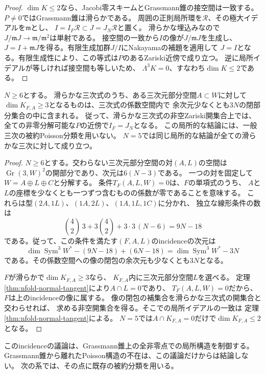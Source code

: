 \begin{proof}
$\dim K\le2$なら、Jacobi零スキームとGrassmann錐の接空間は一致する。
$P\ne0$ではGrassmann錐は滑らかである。
周囲の正則局所環を$\mathcal R$、その極大イデアルを$\mathfrak m$とし、
$I=I_F\mathcal R\subset J=J_N\mathcal R$と置く。
滑らかな埋込みなので$J/\mathfrak mJ\to\mathfrak m/\mathfrak m^2$は単射である。
接空間の一致から$I$の像が$J/\mathfrak mJ$を生成し、
$J=I+\mathfrak mJ$を得る。有限生成加群$J/I$にNakayamaの補題を適用して
$J=I$となる。有限生成性により、この等式は$P$のあるZariski近傍で成り立つ。
逆に局所イデアルが等しければ接空間も等しいため、
$\Lambda^3K=0$、すなわち$\dim K\le2$である。
\end{proof}

\begin{lemma}[非零層の横断性を与える係数開集合]
\label{lem:nfold-generic-transverse}
$N\ge6$とする。
滑らかな三次式のうち、ある三次元部分空間$A\subset W$に対して
$\dim K_{F,A}\ge3$となるものは、三次式の係数空間内で
余次元少なくとも$3N$の閉部分集合の中に含まれる。
従って、滑らかな三次式の非空Zariski開集合上では、
全ての非零分解可能な$P$の近傍で$I_F=J_N$となる。
この局所的な結論には、一般三次の被約Poisson分類を用いない。
$N=5$では同じ局所的な結論が全ての滑らかな三次に対して成り立つ。
\end{lemma}
\begin{proof}
$N\ge6$とする。交わらない三次元部分空間の対$(A,L)$の空間は
$\operatorname{Gr}(3,W)^2$の開部分であり、次元は$6(N-3)$である。
一つの対を固定して$W=A\oplus L\oplus C$と分解する。
条件$T_F(A,L,W)=0$は、$F$の単項式のうち、
$A$と$L$の座標を少なくとも一つずつ含むものの係数が零であることを意味する。
これらは型$(2A,1L)$、$(1A,2L)$、$(1A,1L,1C)$に分かれ、
独立な線形条件の数は
\[
 \binom42\,3+3\binom42+3\cdot3\,(N-6)=9N-18
\]
である。従って、この条件を満たす$(F,A,L)$のincidenceの次元は
\[
 \dim\operatorname{Sym}^3W^*-(9N-18)+(6N-18)
 =\dim\operatorname{Sym}^3W^*-3N
\]
である。その係数空間への像の閉包の余次元も少なくとも$3N$となる。

$F$が滑らかで$\dim K_{F,A}\ge3$なら、
$K_{F,A}$内に三次元部分空間$L$を選べる。
定理\ref{thm:nfold-normal-tangent}により$A\cap L=0$であり、
$T_F(A,L,W)=0$だから、$F$は上のincidenceの像に属する。
像の閉包の補集合を滑らかな三次式の開集合と交わらせれば、
求める非空開集合を得る。そこでの局所イデアルの一致は
定理\ref{thm:nfold-normal-tangent}による。
$N=5$では$A\cap K_{F,A}=0$だけで$\dim K_{F,A}\le2$となる。
\end{proof}

\begin{remark}
このincidenceの議論は、Grassmann錐上の全非零点での局所構造を制御する。
Grassmann錐から離れたPoisson構造の不在は、この議論だけからは結論しない。
次の系では、その点に既存の被約分類を用いる。
\end{remark}

